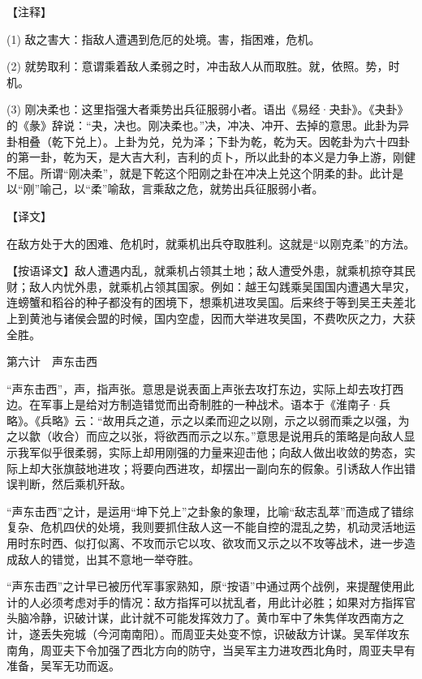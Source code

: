 \documentclass[12pt,UTF8]{ctexbook}
\begin{document}
【注释】


(1) 敌之害大：指敌人遭遇到危厄的处境。害，指困难，危机。

(2) 就势取利：意谓乘着敌人柔弱之时，冲击敌人从而取胜。就，依照。势，时机。

(3) 刚决柔也：这里指强大者乘势出兵征服弱小者。语出《易经·夬卦》。《夬卦》的《彖》辞说：“夬，决也。刚决柔也。”决，冲决、冲开、去掉的意思。此卦为异卦相叠（乾下兑上）。上卦为兑，兑为泽；下卦为乾，乾为天。因乾卦为六十四卦的第一卦，乾为天，是大吉大利，吉利的贞卜，所以此卦的本义是力争上游，刚健不屈。所谓“刚决柔”，就是下乾这个阳刚之卦在冲决上兑这个阴柔的卦。此计是以“刚”喻己，以“柔”喻敌，言乘敌之危，就势出兵征服弱小者。





【译文】


在敌方处于大的困难、危机时，就乘机出兵夺取胜利。这就是“以刚克柔”的方法。

【按语译文】敌人遭遇内乱，就乘机占领其土地；敌人遭受外患，就乘机掠夺其民财；敌人内忧外患，就乘机占领其国家。例如：越王勾践乘吴国国内遭遇大旱灾，连螃蟹和稻谷的种子都没有的困境下，想乘机进攻吴国。后来终于等到吴王夫差北上到黄池与诸侯会盟的时候，国内空虚，因而大举进攻吴国，不费吹灰之力，大获全胜。





第六计　声东击西


“声东击西”，声，指声张。意思是说表面上声张去攻打东边，实际上却去攻打西边。在军事上是给对方制造错觉而出奇制胜的一种战术。语本于《淮南子·兵略》。《兵略》云：“故用兵之道，示之以柔而迎之以刚，示之以弱而乘之以强，为之以歙（收合）而应之以张，将欲西而示之以东。”意思是说用兵的策略是向敌人显示我军似乎很柔弱，实际上却用刚强的力量来迎击他；向敌人做出收敛的势态，实际上却大张旗鼓地进攻；将要向西进攻，却摆出一副向东的假象。引诱敌人作出错误判断，然后乘机歼敌。

“声东击西”之计，是运用“坤下兑上”之卦象的象理，比喻“敌志乱萃”而造成了错综复杂、危机四伏的处境，我则要抓住敌人这一不能自控的混乱之势，机动灵活地运用时东时西、似打似离、不攻而示它以攻、欲攻而又示之以不攻等战术，进一步造成敌人的错觉，出其不意地一举夺胜。

“声东击西”之计早已被历代军事家熟知，原“按语”中通过两个战例，来提醒使用此计的人必须考虑对手的情况：敌方指挥可以扰乱者，用此计必胜；如果对方指挥官头脑冷静，识破计谋，此计就不可能发挥效力了。黄巾军中了朱隽佯攻西南方之计，遂丢失宛城（今河南南阳）。而周亚夫处变不惊，识破敌方计谋。吴军佯攻东南角，周亚夫下令加强了西北方向的防守，当吴军主力进攻西北角时，周亚夫早有准备，吴军无功而返。
\end{document}
